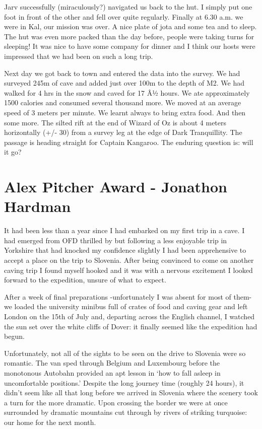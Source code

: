 Jarv successfully (miraculously?) navigated us back to the hut. I simply
put one foot in front of the other and fell over quite regularly.
Finally at 6.30 a.m. we were in Kal, our mission was over. A nice plate
of jota and some tea and to sleep. The hut was even more packed than the
day before, people were taking turns for sleeping! It was nice to have
some company for dinner and I think our hosts were impressed that we had
been on such a long trip.

Next day we got back to town and entered the data into the survey. We
had surveyed 245m of cave and added just over 100m to the depth of M2.
We had walked for 4 hrs in the snow and caved for 17 Â½ hours. We ate
approximately 1500 calories and consumed several thousand more. We moved
at an average speed of 3 meters per minute. We learnt always to bring
extra food. And then some more. The silted rift at the end of Wizard of
Oz is about 4 meters horizontally (+/- 30) from a survey leg at the edge
of Dark Tranquillity. The passage is heading straight for Captain
Kangaroo. The enduring question is: will it go?


\section{Alex Pitcher Award - Jonathon
Hardman}\label{alex-pitcher-award---jonathon-hardman}

It had been less than a year since I had embarked on my first trip in a
cave. I had emerged from OFD thrilled by but following a less enjoyable
trip in Yorkshire that had knocked my confidence slightly I had been
apprehensive to accept a place on the trip to Slovenia. After being
convinced to come on another caving trip I found myself hooked and it
was with a nervous excitement I looked forward to the expedition, unsure
of what to expect.

After a week of final preparations -unfortunately I was absent for most
of them- we loaded the university minibus full of crates of food and
caving gear and left London on the 15th of July and, departing across
the English channel, I watched the sun set over the white cliffs of
Dover: it finally seemed like the expedition had begun.

Unfortunately, not all of the sights to be seen on the drive to Slovenia
were so romantic. The van sped through Belgium and Luxembourg before the
monotonous Autobahn provided an apt lesson in `how to fall asleep in
uncomfortable positions.' Despite the long journey time (roughly 24
hours), it didn't seem like all that long before we arrived in Slovenia
where the scenery took a turn for the more dramatic. Upon crossing the
border we were at once surrounded by dramatic mountains cut through by
rivers of striking turquoise: our home for the next month.

